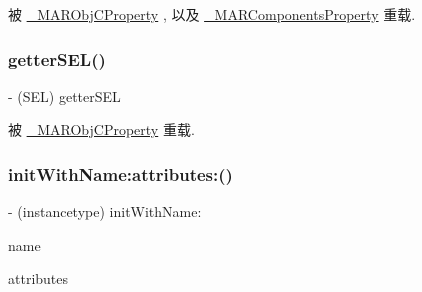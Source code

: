 被 \hyperlink{interface___m_a_r_obj_c_property_a0235ec3957b19ebf1830296486bbeaed}{\+\_\+\+M\+A\+R\+Obj\+C\+Property} , 以及 \hyperlink{interface___m_a_r_components_property_a9bdc841854f880fa2064c69b675ed84d}{\+\_\+\+M\+A\+R\+Components\+Property} 重载.

\mbox{\label{interface_m_a_r_property_a729de14e7703def75d9cf4d632e801e2}} 
\subsubsection{\texorpdfstring{getter\+S\+E\+L()}{getterSEL()}}
{\footnotesize\ttfamily -\/ (S\+EL) getter\+S\+EL \begin{DoxyParamCaption}{ }\end{DoxyParamCaption}}



被 \hyperlink{interface___m_a_r_obj_c_property_a16c8828460bd52a4f560dee918700724}{\+\_\+\+M\+A\+R\+Obj\+C\+Property} 重载.

\mbox{\label{interface_m_a_r_property_a416274a9ab704d941cd3f8197d9c0609}} 
\subsubsection{\texorpdfstring{init\+With\+Name\+:attributes\+:()}{initWithName:attributes:()}}
{\footnotesize\ttfamily -\/ (instancetype) init\+With\+Name\+: \begin{DoxyParamCaption}\item[{(N\+S\+String $\ast$)}]{name }\item[{attributes:(N\+S\+Dictionary $\ast$)}]{attributes }\end{DoxyParamCaption}}

\mbox{\label{interface_m_a_r_property_a568413fa1d786cb401adbb22a264b04d}} 

